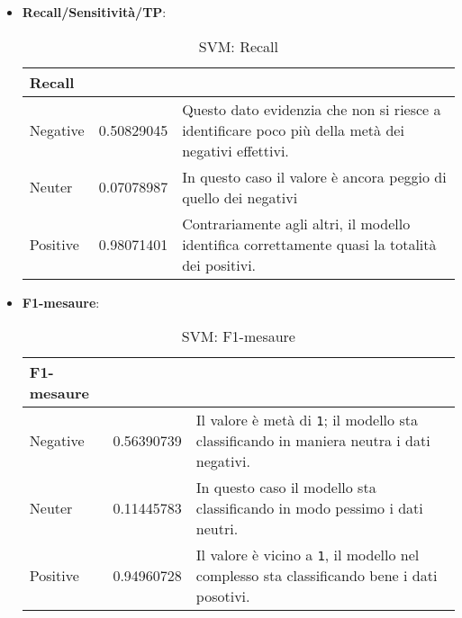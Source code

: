 \begin{itemize}
				\item \textbf{Recall/Sensitività/TP}:
				
				\begin{table}[H]
					\caption{SVM: Recall}
					\label{tab:RecallSVM}
					\centering
					\begin{tabular}{llp{}}
						\toprule 
						\textbf{Recall}	\\
						\midrule
						Negative  & 0.50829045  & Questo dato evidenzia che non si riesce a identificare poco più della metà dei negativi effettivi.\\
						Neuter & 0.07078987 & In questo caso il valore è ancora peggio di quello dei negativi\\
						Positive & 0.98071401 & Contrariamente agli altri, il modello identifica correttamente quasi la totalità dei positivi.\\
						\bottomrule
					\end{tabular}
				\end{table}
			
			\item \textbf{F1-mesaure}:
			
			\begin{table} [H]
				\caption{SVM: F1-mesaure}
				\label{tab:F1-mesaureSVM}
				\centering
				\begin{tabular}{llp{}}
					\toprule 
					\textbf{F1-mesaure}	\\
					\midrule
					Negative  & 0.56390739  & Il valore è metà di \verb|1|; il modello sta classificando in maniera neutra i dati negativi.\\
					Neuter & 0.11445783 & In questo caso il modello sta classificando in modo pessimo i dati neutri.\\
					Positive & 0.94960728 & Il valore è vicino a \verb|1|, il modello nel complesso sta classificando bene i dati posotivi.\\
					\bottomrule
				\end{tabular}
			\end{table}
				
		\end{itemize}
				
